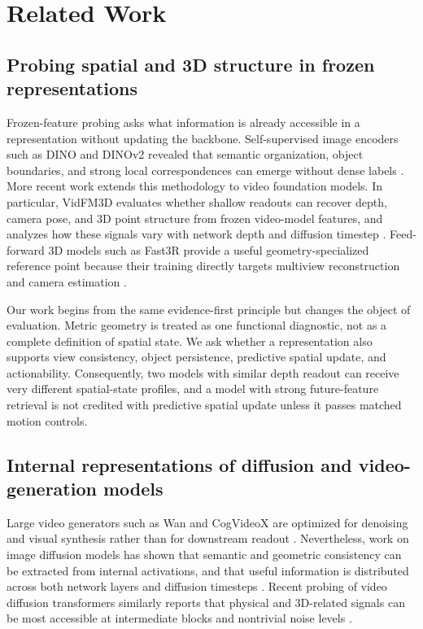\documentclass{article} %
\begin{document}
\section{Related Work}
\label{sec:related-work}

\subsection{Probing spatial and 3D structure in frozen representations}
\label{sec:rw-probing}

Frozen-feature probing asks what information is already accessible in a
representation without updating the backbone. Self-supervised image encoders
such as DINO and DINOv2 revealed that semantic organization, object boundaries,
and strong local correspondences can emerge without dense labels
\citep{caron2021dino,oquab2024dinov2}. More recent work extends this methodology
to video foundation models. In particular, VidFM3D evaluates whether shallow
readouts can recover depth, camera pose, and 3D point structure from frozen
video-model features, and analyzes how these signals vary with network depth
and diffusion timestep \citep{huang2025vidfm3d}. Feed-forward 3D models such as
Fast3R provide a useful geometry-specialized reference point because their
training directly targets multiview reconstruction and camera estimation
\citep{yang2025fast3r}.

Our work begins from the same evidence-first principle but changes the object
of evaluation. Metric geometry is treated as one functional diagnostic,
not as a complete definition of spatial state. We ask whether a representation
also supports view consistency, object persistence,
predictive spatial update, and actionability.
Consequently, two models with similar depth readout can receive very different
spatial-state profiles, and a model with strong future-feature retrieval is not
credited with predictive spatial update unless it passes matched motion controls.

\subsection{Internal representations of diffusion and video-generation models}
\label{sec:rw-diffusion}

Large video generators such as Wan and CogVideoX are optimized for denoising and
visual synthesis rather than for downstream readout
\citep{wanteam2025wan,yang2024cogvideox}. Nevertheless, work on image diffusion
models has shown that semantic and geometric consistency can be extracted
from internal activations, and that useful information is distributed across
both network layers and diffusion timesteps
\citep{tang2023dift,luo2023diffusionhyperfeatures}. Recent probing of video
diffusion transformers similarly reports that physical and 3D-related signals
can be most accessible at intermediate blocks and nontrivial noise levels
\citep{huang2025vidfm3d,esmati2026invisible}.
\end{document}

